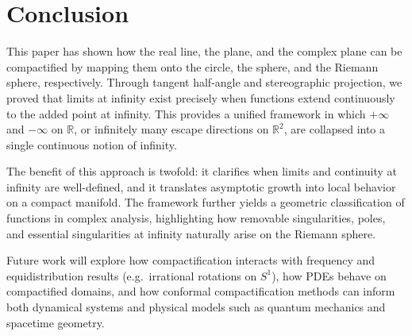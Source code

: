 \documentclass[12pt]{article}
\theoremstyle{remark}
\begin{document}
\section{Conclusion}

This paper has shown how the real line, the plane, and the complex plane can be 
compactified by mapping them onto the circle, the sphere, and the Riemann sphere, 
respectively. Through tangent half-angle and stereographic projection, we proved 
that limits at infinity exist precisely when functions extend continuously to the 
added point at infinity. This provides a unified framework in which $+\infty$ and 
$-\infty$ on $\mathbb{R}$, or infinitely many escape directions on $\mathbb{R}^2$, 
are collapsed into a single continuous notion of infinity.  

The benefit of this approach is twofold: it clarifies when limits and continuity 
at infinity are well-defined, and it translates asymptotic growth into local 
behavior on a compact manifold. The framework further yields a geometric 
classification of functions in complex analysis, highlighting how removable 
singularities, poles, and essential singularities at infinity naturally arise on 
the Riemann sphere.  

Future work will explore how compactification interacts with frequency and 
equidistribution results (e.g.\ irrational rotations on $S^1$), how PDEs behave 
on compactified domains, and how conformal compactification methods can inform 
both dynamical systems and physical models such as quantum mechanics and 
spacetime geometry.

\end{document}
